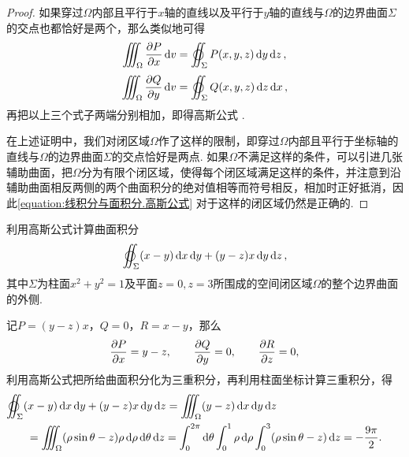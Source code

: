 \begin{theorem}
\begin{proof}
如果穿过\(\Omega\)内部且平行于\(x\)轴的直线以及平行于\(y\)轴的直线与\(\Omega\)的边界曲面\(\Sigma\)的交点也都恰好是两个，那么类似地可得\[
\iiint_\Omega \pdv{P}{x} \dd{v} = \varoiint_\Sigma P(x,y,z) \dd{y}\dd{z},
\]\[
\iiint_\Omega \pdv{Q}{y} \dd{v} = \varoiint_\Sigma Q(x,y,z) \dd{z}\dd{x},
\]再把以上三个式子两端分别相加，即得高斯公式 .

在上述证明中，我们对闭区域\(\Omega\)作了这样的限制，即穿过\(\Omega\)内部且平行于坐标轴的直线与\(\Omega\)的边界曲面\(\Sigma\)的交点恰好是两点.
如果\(\Omega\)不满足这样的条件，可以引进几张辅助曲面，把\(\Omega\)分为有限个闭区域，使得每个闭区域满足这样的条件，并注意到沿辅助曲面相反两侧的两个曲面积分的绝对值相等而符号相反，相加时正好抵消，因此\cref{equation:线积分与面积分.高斯公式} 对于这样的闭区域仍然是正确的.
\end{proof}
\end{theorem}


\begin{example}
利用高斯公式计算曲面积分\[
\varoiint_\Sigma (x-y) \dd{x}\dd{y} + (y-z)x \dd{y}\dd{z},
\]其中\(\Sigma\)为柱面\(x^2+y^2=1\)及平面\(z=0,z=3\)所围成的空间闭区域\(\Omega\)的整个边界曲面的外侧.
\begin{solution}
记\(P=(y-z)x\)，\(Q=0\)，\(R=x-y\)，那么\[
\pdv{P}{x} = y-z,
\qquad
\pdv{Q}{y} = 0,
\qquad
\pdv{R}{z} = 0,
\]利用高斯公式把所给曲面积分化为三重积分，再利用柱面坐标计算三重积分，得\begin{align*}
&\hspace{-20pt}\varoiint_\Sigma (x-y) \dd{x}\dd{y} + (y-z)x \dd{y}\dd{z}
= \iiint_\Omega (y-z) \dd{x}\dd{y}\dd{z} \\
&= \iiint_\Omega (\rho\sin\theta-z)\rho\dd{\rho}\dd{\theta}\dd{z}
= \int_0^{2\pi} \dd{\theta} \int_0^1 \rho\dd{\rho} \int_0^3 (\rho\sin\theta-z) \dd{z}
= -\frac{9\pi}{2}.
\end{align*}
\end{solution}
\end{example}

